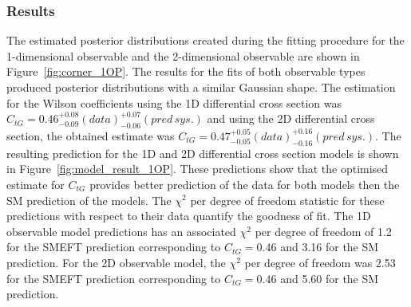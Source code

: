 \documentclass[a4paper,11pt]{article}
\begin{document}
\subsubsection{Results}
The estimated posterior distributions created during the fitting procedure for the 1-dimensional observable and the 2-dimensional observable are shown in Figure~\ref{fig:corner_1OP}.
The results for the fits of both observable types produced posterior distributions with a similar Gaussian shape.
The estimation for the Wilson coefficients using the 1D differential cross section was $C_{tG}=0.46^{+0.08}_{-0.09}(data)^{+0.07}_{-0.06}(pred\,sys.)$ and using the 2D differential cross section, the obtained estimate was $C_{tG}=0.47^{+0.05}_{-0.05}(data)^{+0.16}_{-0.16}(pred\,sys.)$.
The resulting prediction for the 1D and 2D differential cross section models is shown in Figure~\ref{fig:model_result_1OP}.
These predictions show that the optimised estimate for $C_{tG}$ provides better prediction of the data for both models then the SM prediction of the models.
The $\chi^{2}$ per degree of freedom statistic for these predictions with respect to their data quantify the goodness of fit.
The 1D observable model predictions has an associated $\chi^{2}$ per degree of freedom of 1.2 for the SMEFT prediction corresponding to $C_{tG}=0.46$ and 3.16 for the SM prediction.
For the 2D observable model, the $\chi^{2}$ per degree of freedom was 2.53 for the SMEFT prediction corresponding to $C_{tG}=0.46$ and 5.60 for the SM prediction.
\end{document}
